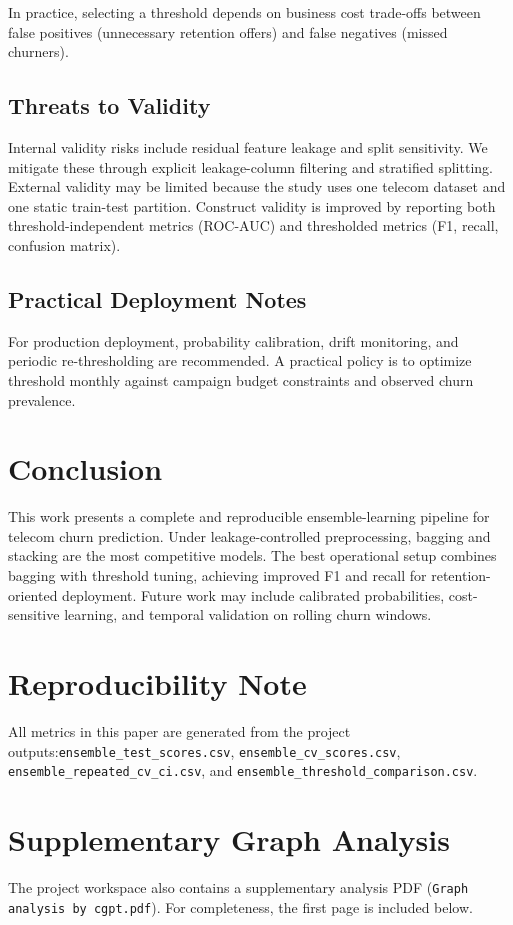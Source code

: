 \documentclass[conference]{IEEEtran}
\begin{document}
In practice, selecting a threshold depends on business cost trade-offs between false positives (unnecessary retention offers) and false negatives (missed churners).

\subsection{Threats to Validity}
Internal validity risks include residual feature leakage and split sensitivity. We mitigate these through explicit leakage-column filtering and stratified splitting. External validity may be limited because the study uses one telecom dataset and one static train-test partition. Construct validity is improved by reporting both threshold-independent metrics (ROC-AUC) and thresholded metrics (F1, recall, confusion matrix).

\subsection{Practical Deployment Notes}
For production deployment, probability calibration, drift monitoring, and periodic re-thresholding are recommended. A practical policy is to optimize threshold monthly against campaign budget constraints and observed churn prevalence.

\section{Conclusion}
This work presents a complete and reproducible ensemble-learning pipeline for telecom churn prediction. Under leakage-controlled preprocessing, bagging and stacking are the most competitive models. The best operational setup combines bagging with threshold tuning, achieving improved F1 and recall for retention-oriented deployment. Future work may include calibrated probabilities, cost-sensitive learning, and temporal validation on rolling churn windows.

\section*{Reproducibility Note}
All metrics in this paper are generated from the project outputs:\texttt{ensemble\_test\_scores.csv}, \texttt{ensemble\_cv\_scores.csv}, \texttt{ensemble\_repeated\_cv\_ci.csv}, and \texttt{ensemble\_threshold\_comparison.csv}.

\appendices
\section{Supplementary Graph Analysis}
The project workspace also contains a supplementary analysis PDF (\texttt{Graph analysis by cgpt.pdf}). For completeness, the first page is included below.





\end{document}
